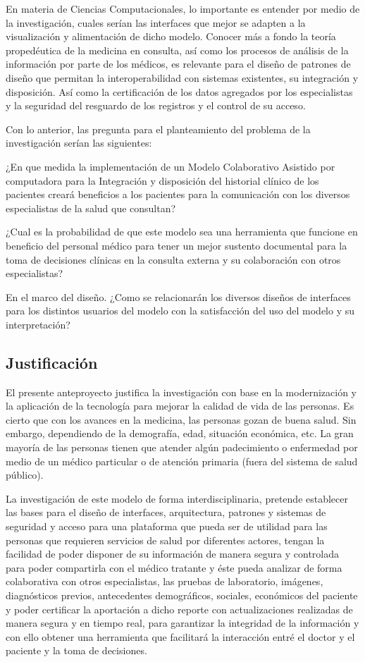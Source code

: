     En materia de Ciencias Computacionales, lo importante es entender por medio de la investigación, cuales serían las interfaces que mejor se adapten a la visualización y alimentación de dicho modelo. Conocer más a fondo la teoría propedéutica de la medicina en consulta, así como los procesos de análisis de la información por parte de los médicos, es relevante para el diseño de patrones de diseño que permitan la interoperabilidad con sistemas existentes, su integración y disposición. Así como la certificación de los datos agregados por los especialistas y la seguridad del resguardo de los registros y el control de su acceso.

    Con lo anterior, las pregunta para el planteamiento del problema de la investigación serían las siguientes:

    ¿En que medida la implementación de un Modelo Colaborativo Asistido por computadora para la Integración y disposición del historial clínico de los pacientes creará beneficios a los pacientes para la comunicación con los diversos especialistas de la salud que consultan?

    ¿Cual es la probabilidad de que este modelo sea una herramienta que funcione en beneficio del personal médico para tener un mejor sustento documental para la toma de decisiones clínicas en la consulta externa y su colaboración con otros especialistas?

    En el marco del diseño. ¿Como se relacionarán los diversos diseños de interfaces para los distintos usuarios del modelo con la satisfacción del uso del modelo y su interpretación?
    \subsection{Justificación}
    El presente anteproyecto justifica la investigación con base en la modernización y la aplicación de la tecnología para mejorar la calidad de vida de las personas. Es cierto que con los avances en la medicina, las personas gozan de buena salud. Sin embargo, dependiendo de la demografía, edad, situación económica, etc. La gran mayoría de las personas tienen que atender algún padecimiento o enfermedad por medio de un médico particular o de atención primaria (fuera del sistema de salud público).
    
    La investigación de este modelo de forma interdisciplinaria, pretende establecer las bases para el diseño de interfaces, arquitectura, patrones y sistemas de seguridad y acceso para una plataforma que pueda ser de utilidad para las personas que requieren servicios de salud por diferentes actores, tengan la facilidad de poder disponer de su información de manera segura y controlada para poder compartirla con el médico tratante y éste pueda analizar de forma colaborativa con otros especialistas, las pruebas de laboratorio, imágenes, diagnósticos previos, antecedentes demográficos, sociales, económicos del paciente y poder certificar la aportación a dicho reporte con actualizaciones realizadas de manera segura y en tiempo real, para garantizar la integridad de la información y con ello obtener una herramienta que facilitará la interacción entré el doctor y el paciente y la toma de decisiones.
